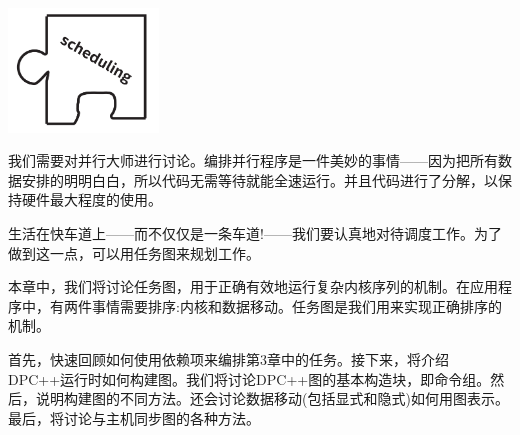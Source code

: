 \begin{center}
	\includegraphics[width=0.3\textwidth]{content/chapter-8/images/1}
\end{center}

我们需要对并行大师进行讨论。编排并行程序是一件美妙的事情——因为把所有数据安排的明明白白，所以代码无需等待就能全速运行。并且代码进行了分解，以保持硬件最大程度的使用。\par

生活在快车道上——而不仅仅是一条车道!——我们要认真地对待调度工作。为了做到这一点，可以用任务图来规划工作。\par

本章中，我们将讨论任务图，用于正确有效地运行复杂内核序列的机制。在应用程序中，有两件事情需要排序:内核和数据移动。任务图是我们用来实现正确排序的机制。\par

首先，快速回顾如何使用依赖项来编排第3章中的任务。接下来，将介绍DPC++运行时如何构建图。我们将讨论DPC++图的基本构造块，即命令组。然后，说明构建图的不同方法。还会讨论数据移动(包括显式和隐式)如何用图表示。最后，将讨论与主机同步图的各种方法。\par